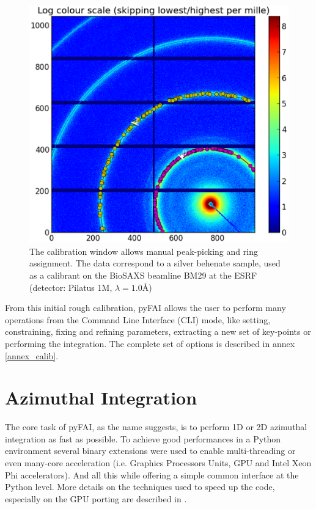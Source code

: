 \documentclass[preprint]{iucr}
\begin{document}
\begin{figure}
\label{calib}
\begin{center}
\includegraphics[width=15cm]{calib.eps}
\caption{The calibration window allows manual peak-picking and
ring assignment. The data correspond to a silver behenate sample, used as a
calibrant on the BioSAXS beamline BM29 at the ESRF
(detector: Pilatus 1M, $\lambda=1.0${\AA})}
\end{center}
\end{figure}

From this initial rough calibration, pyFAI allows the user to perform many operations
from the Command Line Interface (CLI) mode, like setting, constraining, fixing and
refining parameters, extracting a new set of key-points or performing the
integration. The complete set of options is described in annex
\ref{annex_calib}.

\section{Azimuthal Integration}

The core task of pyFAI, as the name suggests, is to perform 1D or 2D azimuthal 
integration as fast as possible. To achieve good performances in a Python environment
several binary extensions were used to enable multi-threading or even many-core
acceleration (i.e. Graphics Processors Units, GPU and Intel Xeon Phi accelerators).
And all this while offering a simple common interface at the Python level.
More details on the techniques used to speed up the code, especially on the GPU porting
are described in \cite{kieffer_ashiotis-proc-euroscipy-2014}.
\end{document}
